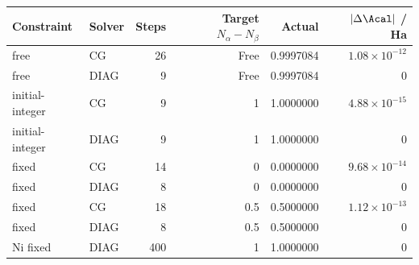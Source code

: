 \begin{tabular}{llrrrr}\toprule
Constraint & Solver & Steps & Target $N_\alpha-N_\beta$ & Actual & $|\Delta\Acal|$ / Ha\\\midrule
free & CG & 26 & Free & 0.9997084 & $1.08\times10^{-12}$\\
free & DIAG & 9 & Free & 0.9997084 & $0$\\
initial-integer & CG & 9 & 1 & 1.0000000 & $4.88\times10^{-15}$\\
initial-integer & DIAG & 9 & 1 & 1.0000000 & $0$\\
fixed & CG & 14 & 0 & 0.0000000 & $9.68\times10^{-14}$\\
fixed & DIAG & 8 & 0 & 0.0000000 & $0$\\
fixed & CG & 18 & 0.5 & 0.5000000 & $1.12\times10^{-13}$\\
fixed & DIAG & 8 & 0.5 & 0.5000000 & $0$\\
Ni fixed & DIAG & 400 & 1 & 1.0000000 & $0$\\
\bottomrule\end{tabular}
